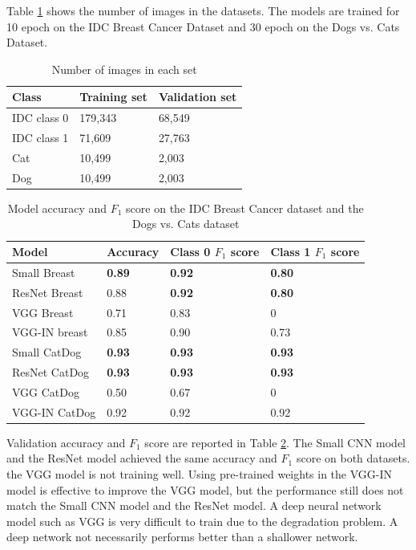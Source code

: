 Table \ref{stats} shows the number of images in the datasets. The models are trained for 10 epoch on the IDC Breast Cancer Dataset and 30 epoch on the Dogs vs. Cats Dataset.
\begin{table}[h]
\centering
\begin{tabular}{ |p{3cm}||p{3cm}|p{3cm}|  }
 \hline
 Class       & Training set & Validation set\\
 \hline
 \hline
 IDC class 0   & 179,343   &  68,549 \\
 IDC class 1  & 71,609  & 27,763\\
 \hline
 Cat   & 10,499  &  2,003\\
 Dog  & 10,499  &  2,003\\
 \hline
\end{tabular}
\caption{Number of images in each set}
\label{stats}
\end{table}


\begin{table}[h]
\centering
\begin{tabular}{ |p{4cm}||p{3cm}|p{3cm}|p{3cm}|  }
 \hline
 Model       & Accuracy & Class 0 $F_1$ score & Class 1 $F_1$ score\\
 \hline
 \hline
 Small Breast   & \textbf{0.89}  & \textbf{0.92} &  \textbf{0.80}\\
 ResNet Breast  & 0.88  & \textbf{0.92} &  \textbf{0.80}\\
 VGG Breast      & 0.71  & 0.83 &  0\\
 VGG-IN breast & 0.85 & 0.90 & 0.73 \\
 \hline
 Small CatDog   & \textbf{0.93}  & \textbf{0.93} &  \textbf{0.93}\\
 ResNet CatDog  & \textbf{0.93}  & \textbf{0.93} &  \textbf{0.93}\\
 VGG CatDog      & 0.50  & 0.67 &  0\\
 VGG-IN CatDog  & 0.92 & 0.92 & 0.92 \\
  \hline
\end{tabular}
\caption{Model accuracy and $F_1$ score on the IDC Breast Cancer dataset and the Dogs vs. Cats dataset}
\label{acctable2}
\end{table}

Validation accuracy and $F_1$ score are reported in Table \ref{acctable2}. The Small CNN model and the ResNet model achieved the same accuracy and $F_1$ score on both datasets. the VGG model is not training well. Using pre-trained weights in the VGG-IN model is effective to improve the VGG model, but the performance still does not match the Small CNN model and the ResNet model. A deep neural network model such as VGG is very difficult to train due to the degradation problem. A deep network not necessarily performs better than a shallower network.

